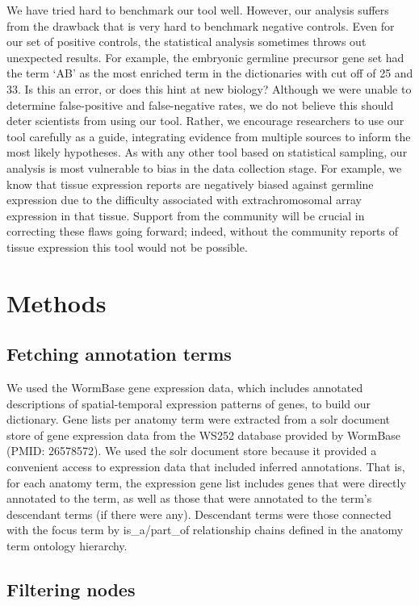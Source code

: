 \documentclass{bmcart}
\begin{document}
We have tried hard to benchmark our tool well. However, our analysis suffers from the drawback that is very hard to benchmark negative controls. Even for our set of positive controls, the statistical analysis sometimes throws out unexpected results. For example, the embryonic germline precursor gene set had the term `AB' as the most enriched term in the dictionaries with cut off of 25 and 33. Is this an error, or does this hint at new biology? Although we were unable to determine false-positive and false-negative rates, we do not believe this should deter scientists from using our tool. Rather, we encourage researchers to use our tool carefully as a guide, integrating evidence from multiple sources to inform the most likely hypotheses. As with any other tool based on statistical sampling, our analysis is most vulnerable to bias in the data collection stage. For example, we know that tissue expression reports are negatively biased against germline expression due to the difficulty associated with extrachromosomal array expression in that tissue. Support from the community will be crucial in correcting these flaws going forward; indeed, without the community reports of tissue expression this tool would not be possible.

\section*{Methods}
\subsection*{Fetching annotation terms}
We used the WormBase gene expression data, which includes annotated descriptions of spatial-temporal expression patterns of genes, to build our dictionary. Gene lists per anatomy term were extracted from a solr document store of gene expression data from the WS252 database provided by WormBase (PMID: 26578572). We used the solr document store because it provided a convenient access to expression data that included inferred annotations. That is, for each anatomy term, the expression gene list includes genes that were directly annotated to the term, as well as those that were annotated to the term's descendant terms (if there were any). Descendant terms were those connected with the focus term by is\_a/part\_of relationship chains defined in the anatomy term ontology hierarchy.
\subsection*{Filtering nodes}
\end{document}
